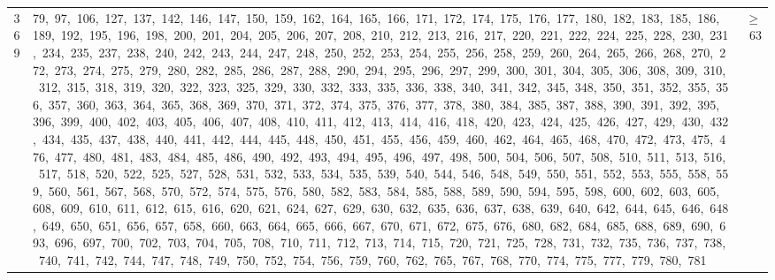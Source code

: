 \begin{longtable}{c|p{}|r}
369 & 79,\ 97,\ 106,\ 127,\ 137,\ 142,\ 146,\ 147,\ 150,\ 159,\ 162,\ 164,\ 165,\ 166,\ 171,\ 172,\ 174,\ 175,\ 176,\ 177,\ 180,\ 182,\ 183,\ 185,\ 186,\ 189,\ 192,\ 195,\ 196,\ 198,\ 200,\ 201,\ 204,\ 205,\ 206,\ 207,\ 208,\ 210,\ 212,\ 213,\ 216,\ 217,\ 220,\ 221,\ 222,\ 224,\ 225,\ 228,\ 230,\ 231,\ 234,\ 235,\ 237,\ 238,\ 240,\ 242,\ 243,\ 244,\ 247,\ 248,\ 250,\ 252,\ 253,\ 254,\ 255,\ 256,\ 258,\ 259,\ 260,\ 264,\ 265,\ 266,\ 268,\ 270,\ 272,\ 273,\ 274,\ 275,\ 279,\ 280,\ 282,\ 285,\ 286,\ 287,\ 288,\ 290,\ 294,\ 295,\ 296,\ 297,\ 299,\ 300,\ 301,\ 304,\ 305,\ 306,\ 308,\ 309,\ 310,\ 312,\ 315,\ 318,\ 319,\ 320,\ 322,\ 323,\ 325,\ 329,\ 330,\ 332,\ 333,\ 335,\ 336,\ 338,\ 340,\ 341,\ 342,\ 345,\ 348,\ 350,\ 351,\ 352,\ 355,\ 356,\ 357,\ 360,\ 363,\ 364,\ 365,\ 368,\ 369,\ 370,\ 371,\ 372,\ 374,\ 375,\ 376,\ 377,\ 378,\ 380,\ 384,\ 385,\ 387,\ 388,\ 390,\ 391,\ 392,\ 395,\ 396,\ 399,\ 400,\ 402,\ 403,\ 405,\ 406,\ 407,\ 408,\ 410,\ 411,\ 412,\ 413,\ 414,\ 416,\ 418,\ 420,\ 423,\ 424,\ 425,\ 426,\ 427,\ 429,\ 430,\ 432,\ 434,\ 435,\ 437,\ 438,\ 440,\ 441,\ 442,\ 444,\ 445,\ 448,\ 450,\ 451,\ 455,\ 456,\ 459,\ 460,\ 462,\ 464,\ 465,\ 468,\ 470,\ 472,\ 473,\ 475,\ 476,\ 477,\ 480,\ 481,\ 483,\ 484,\ 485,\ 486,\ 490,\ 492,\ 493,\ 494,\ 495,\ 496,\ 497,\ 498,\ 500,\ 504,\ 506,\ 507,\ 508,\ 510,\ 511,\ 513,\ 516,\ 517,\ 518,\ 520,\ 522,\ 525,\ 527,\ 528,\ 531,\ 532,\ 533,\ 534,\ 535,\ 539,\ 540,\ 544,\ 546,\ 548,\ 549,\ 550,\ 551,\ 552,\ 553,\ 555,\ 558,\ 559,\ 560,\ 561,\ 567,\ 568,\ 570,\ 572,\ 574,\ 575,\ 576,\ 580,\ 582,\ 583,\ 584,\ 585,\ 588,\ 589,\ 590,\ 594,\ 595,\ 598,\ 600,\ 602,\ 603,\ 605,\ 608,\ 609,\ 610,\ 611,\ 612,\ 615,\ 616,\ 620,\ 621,\ 624,\ 627,\ 629,\ 630,\ 632,\ 635,\ 636,\ 637,\ 638,\ 639,\ 640,\ 642,\ 644,\ 645,\ 646,\ 648,\ 649,\ 650,\ 651,\ 656,\ 657,\ 658,\ 660,\ 663,\ 664,\ 665,\ 666,\ 667,\ 670,\ 671,\ 672,\ 675,\ 676,\ 680,\ 682,\ 684,\ 685,\ 688,\ 689,\ 690,\ 693,\ 696,\ 697,\ 700,\ 702,\ 703,\ 704,\ 705,\ 708,\ 710,\ 711,\ 712,\ 713,\ 714,\ 715,\ 720,\ 721,\ 725,\ 728,\ 731,\ 732,\ 735,\ 736,\ 737,\ 738,\ 740,\ 741,\ 742,\ 744,\ 747,\ 748,\ 749,\ 750,\ 752,\ 754,\ 756,\ 759,\ 760,\ 762,\ 765,\ 767,\ 768,\ 770,\ 774,\ 775,\ 777,\ 779,\ 780,\ 781 & $\ge$ 63 \\

\end{longtable}
